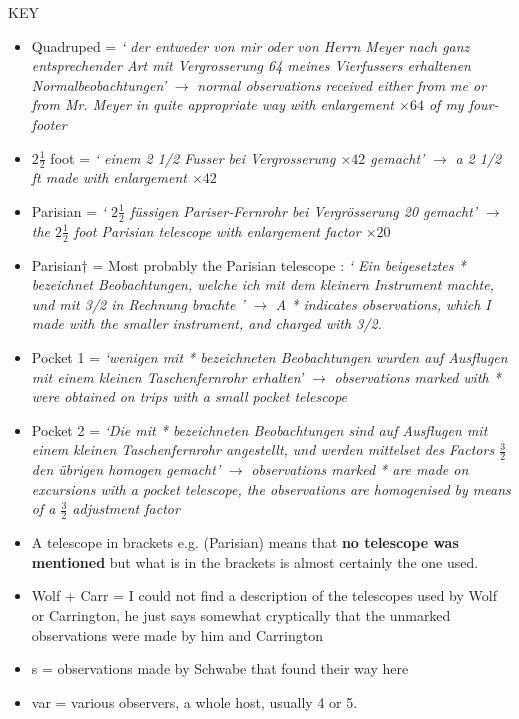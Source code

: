 \documentclass[12pt]{article}
\begin{document}
KEY\\
\begin{itemize}[\ddagger]
    \item Quadruped = \textit{` der entweder von mir oder von Herrn Meyer nach ganz entsprechender Art mit Vergrosserung 64 meines Vierfussers erhaltenen Normalbeobachtungen'} $\longrightarrow$ \textit{normal observations received either from me or from Mr. Meyer in quite appropriate way with enlargement $\times 64$ of my four-footer}
    \item $2\frac{1}{2}$ foot = \textit{` einem 2 1/2 Fusser bei Vergrosserung $\times 42$ gemacht'} $\longrightarrow$ \textit{a 2 1/2 ft made with enlargement $\times 42$}
    \item Parisian = \textit{` $2\frac{1}{2}$ füssigen Pariser-Fernrohr bei Vergrösserung 20 gemacht'} $\longrightarrow$ \textit{the $2\frac{1}{2}$ foot Parisian telescope with enlargement factor $\times 20$}
    \item Parisian$\dagger$ = Most probably the Parisian telescope : \textit{` Ein beigesetztes * bezeichnet Beobachtungen, welche ich mit dem kleinern Instrument machte, und mit 3/2 in Rechnung brachte '} $\longrightarrow$ \textit{A * indicates observations, which I made with the smaller instrument, and charged with 3/2.}
    \item Pocket 1 = \textit{`wenigen mit * bezeichneten Beobachtungen wurden auf Ausflugen mit einem kleinen Taschenfernrohr erhalten'} $\longrightarrow$ \textit{observations marked with * were obtained on trips with a small pocket telescope}
    \item Pocket 2 = \textit{`Die mit * bezeichneten Beobachtungen sind auf Ausflugen mit einem kleinen Taschenfernrohr angestellt, und werden mittelset des Factors $\frac{3}{2}$ den übrigen homogen gemacht'} $\longrightarrow$ \textit{observations marked * are made on excursions with a pocket telescope, the observations are homogenised by means of a $\frac{3}{2}$ adjustment factor}
    \item A telescope in brackets e.g. (Parisian) means that \textbf{no telescope was mentioned} but what is in the brackets is almost certainly the one used.
    \item Wolf + Carr = I could not find a description of the telescopes used by Wolf or Carrington, he just says somewhat cryptically that the unmarked observations were made by him and Carrington
    \item s = observations made by Schwabe that found their way here
    \item var = various observers, a whole host, usually 4 or 5. 
\end{itemize}
\end{document}
